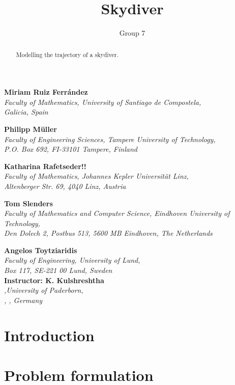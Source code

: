 \documentclass[12pt,a4paper]{article}
\author{Group 7}
\begin{document}
\title{Skydiver}
\maketitle

\begin{center}
\textbf{Miriam Ruiz Ferrández}\\
\textit{Faculty of Mathematics, University of Santiago de Compostela,\\
Galicia, Spain}

\textbf{Philipp M\"{u}ller}\\
\textit{Faculty of Engineering Sciences, Tampere University of Technology,\\
P.O. Box 692, FI-33101 Tampere, Finland}

\textbf{Katharina Rafetseder!!}\\
\textit{Faculty of Mathematics, Johannes Kepler Universit\"{a}t Linz,\\
Altenberger Str. 69, 4040 Linz, Austria}

\textbf{Tom Slenders}\\
\textit{Faculty of Mathematics and Computer Science, Eindhoven University of Technology,\\
Den Dolech 2, Postbus 513, 5600 MB Eindhoven, The Netherlands}

\textbf{Angelos Toytziaridis}\\
\textit{Faculty of Engineering, University of Lund,\\
Box 117, SE-221 00  Lund, Sweden}\\
\vspace{1cm}
\textbf{Instructor: K. Kulshreshtha }\\
\textit{ ,University of Paderborn,\\
, , Germany}

\end{center}

\thispagestyle{empty}
\newpage
\begin{abstract}
Modelling the trajectory of a skydiver.
\end{abstract}
\newpage
\section{Introduction}


\section{Problem formulation}

\end{document}
